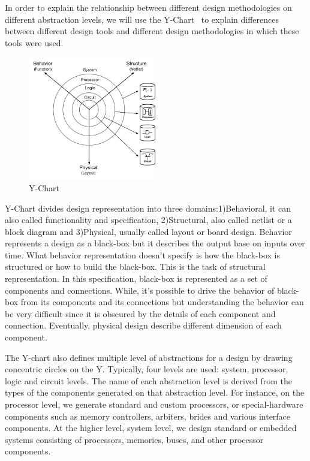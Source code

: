 In order to explain the relationship between different design methodologies on
different abstraction levels, we will use the Y-Chart~\cite{walker_1985_y_model} to explain differences between different design tools and different design methodologies in which these tools were used.

\begin{figure}[h]
    \centering
    \includegraphics[width=0.5\textwidth]{figures/Introduction/Y-Chart.pdf}
    \caption{Y-Chart}
    \label{fig:y-chart}
\end{figure}

Y-Chart divides design representation into three domains:1)Behavioral, it can also called functionality and specification, 2)Structural, also called netlist or a block diagram and 3)Physical, usually called layout or board design. Behavior represents a design as a black-box but it describes the output base on inputs over time. What behavior representation doesn't specify is how the black-box is structured or how to build the black-box. This is the task of structural representation. In this specification, black-box is represented as a set of components and connections. While, it's possible to drive the behavior of black-box from its components and its connections but understanding the behavior can be very difficult since it is obscured by the details of each component and connection.
Eventually, physical design describe different dimension of each component.

The Y-chart also defines multiple level of abstractions for a design by drawing concentric circles on the Y. Typically, four levels are used: system, processor, logic and circuit levels.
The name of each abstraction level is derived from the types of the components generated on that abstraction level.
For instance, on the processor level, we generate standard and custom processors, or special-hardware components such as memory controllers, arbiters, brides and various interface components. At the higher level, system level, we design standard or embedded systems consisting of processors, memories, buses, and other processor components.

